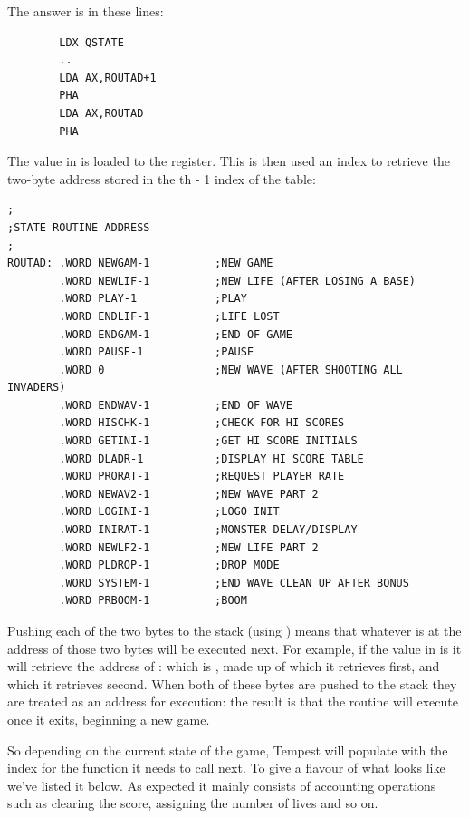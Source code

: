 The answer is in these lines:
\begin{lstlisting}
        LDX QSTATE
        ..
        LDA AX,ROUTAD+1
        PHA
        LDA AX,ROUTAD
        PHA
\end{lstlisting}

The value in  is loaded to the  register. This is then used an index to retrieve the two-byte address
stored in the th - 1 index of the  table: 
\begin{lstlisting}
;
;STATE ROUTINE ADDRESS
;
ROUTAD: .WORD NEWGAM-1          ;NEW GAME
        .WORD NEWLIF-1          ;NEW LIFE (AFTER LOSING A BASE)
        .WORD PLAY-1            ;PLAY
        .WORD ENDLIF-1          ;LIFE LOST
        .WORD ENDGAM-1          ;END OF GAME
        .WORD PAUSE-1           ;PAUSE
        .WORD 0                 ;NEW WAVE (AFTER SHOOTING ALL INVADERS)
        .WORD ENDWAV-1          ;END OF WAVE
        .WORD HISCHK-1          ;CHECK FOR HI SCORES
        .WORD GETINI-1          ;GET HI SCORE INITIALS
        .WORD DLADR-1           ;DISPLAY HI SCORE TABLE
        .WORD PRORAT-1          ;REQUEST PLAYER RATE
        .WORD NEWAV2-1          ;NEW WAVE PART 2
        .WORD LOGINI-1          ;LOGO INIT
        .WORD INIRAT-1          ;MONSTER DELAY/DISPLAY
        .WORD NEWLF2-1          ;NEW LIFE PART 2
        .WORD PLDROP-1          ;DROP MODE
        .WORD SYSTEM-1          ;END WAVE CLEAN UP AFTER BONUS
        .WORD PRBOOM-1          ;BOOM
\end{lstlisting}

Pushing each of the two bytes to the stack (using ) means that whatever is at the address of those two bytes will
be executed next. For example, if the value in  is  it will retrieve the address of : which is
, made up of  which it retrieves first, and  which it retrieves second. When both of these bytes
are pushed to the stack they are treated as an address for execution: the result is that the  routine will execute
 once it exits, beginning a new game. 

So depending on the current state of the game, Tempest will populate  with the index for the function it needs
to call next. To give a flavour of what  looks like we've listed it below. As expected it mainly consists of 
accounting operations such as clearing the score, assigning the number of lives and so on. 

